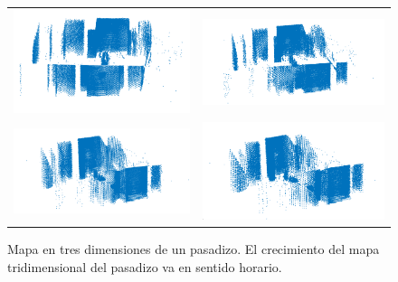 \begin{figure}
\begin{tabular}{cc}
      \includegraphics[width=.52\textwidth]{images/pasadizo_4.png}&
      \includegraphics[width=.52\textwidth]{images/pasadizo_3.png}\\
      \includegraphics[width=.52\textwidth]{images/pasadizo_2.png}&
      \includegraphics[width=.52\textwidth]{images/pasadizo_1.png}\\
    \end{tabular}
  \captionsetup{font=footnotesize}
    \caption{\label{fig:pasadizo3D}Mapa en tres dimensiones de un pasadizo. El crecimiento del mapa 
    tridimensional del pasadizo va en sentido horario.}
\end{figure}


